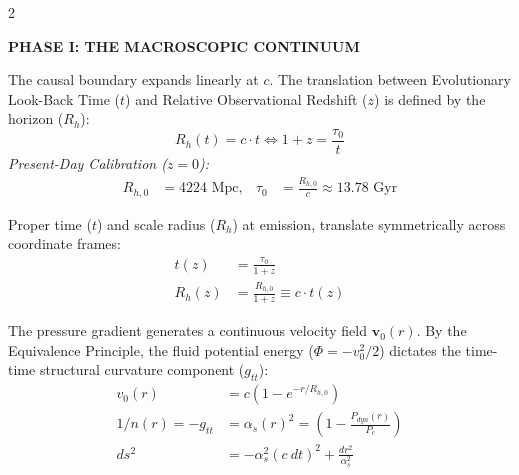 \begin{multicols}{2}

\vspace{0.2cm}
\noindent\textbf{\large \color{academiabrown} PHASE I: THE MACROSCOPIC CONTINUUM}
\vspace{0.2cm}

\begin{tcolorbox}[cheatbox, title={\refstepcounter{cheatnum}\label{box:axiom}\thecheatnum. The Causal Boundary \hfill\makebox[0pt][r]{\scriptsize\hyperref[sec:deriv_axiom]{[Proof $\downarrow$]}}}]
The causal boundary expands linearly at $c$. The translation between Evolutionary Look-Back Time ($t$) and Relative Observational Redshift ($z$) is defined by the horizon ($R_h$):
\begin{equation}\label{eq:axiom}
    R_h(t) = c \cdot t \iff 1+z = \frac{\tau_0}{t}
\end{equation}
\textit{Present-Day Calibration ($z=0$):}
\begin{align*}
    R_{h,0} &= 4224 \text{ Mpc}, &\tau_0 &= \frac{R_{h,0}}{c} \approx 13.78 \text{ Gyr}
\end{align*}
\end{tcolorbox}

\begin{tcolorbox}[cheatbox, title={\refstepcounter{cheatnum}\label{box:chronometer}\thecheatnum. The Redshift Chronometer \hfill\makebox[0pt][r]{\scriptsize\hyperref[sec:deriv_chronometer]{[Proof $\downarrow$]}}}]
Proper time ($t$) and scale radius ($R_h$) at emission, translate symmetrically across coordinate frames:
\begin{align}
    t(z) &= \frac{\tau_0}{1+z} \label{eq:tz} \\
    R_h(z) &= \frac{R_{h,0}}{1+z} \equiv c \cdot t(z) \label{eq:rz}
\end{align}
\end{tcolorbox}

\begin{tcolorbox}[cheatbox, title={\refstepcounter{cheatnum}\label{box:gr_bridge}\thecheatnum. The Geometric Spacetime Bridge \hfill\makebox[0pt][r]{\scriptsize\hyperref[sec:deriv_gr_bridge]{[Proof $\downarrow$]}}}]
The pressure gradient generates a continuous velocity field $\mathbf{v}_0(r)$. By the Equivalence Principle, the fluid potential energy ($\Phi = -v_0^2/2$) dictates the time-time structural curvature component ($g_{tt}$):
\begin{align}
    v_0(r) &= c\left(1-e^{-r/R_{h,0}}\right) \label{eq:v0} \\
   1/n(r) = -g_{tt} &= \alpha_s(r)^2 = \left( 1 - \frac{P_{dyn}(r)}{P_c} \right)   \label{eq:pressure_curvature_identity} \\ 
    ds^2 &= -\alpha_s^2(c~dt)^2 + \frac{dr^2}{\alpha_s^2} \label{eq:metric} 
\end{align}
\end{tcolorbox}


\end{multicols}
